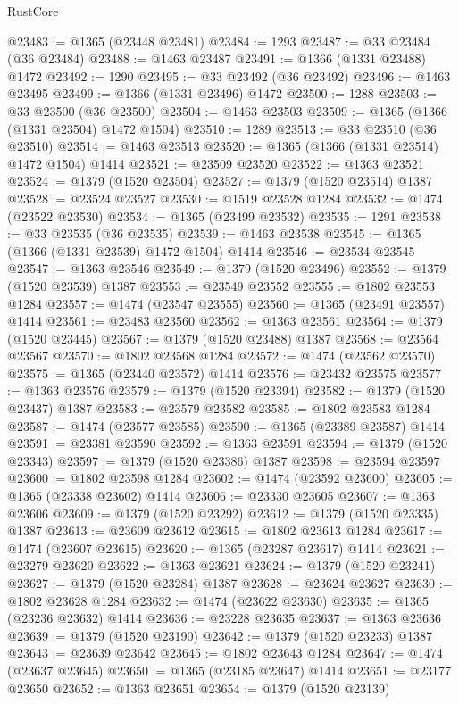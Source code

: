 \begin{lexlean}{RustCore}
\begin{coremodule}
@23483 := @1365 (@23448 @23481)
@23484 := 1293
@23487 := @33 @23484 (@36 @23484)
@23488 := @1463 @23487
@23491 := @1366 (@1331 @23488) @1472
@23492 := 1290
@23495 := @33 @23492 (@36 @23492)
@23496 := @1463 @23495
@23499 := @1366 (@1331 @23496) @1472
@23500 := 1288
@23503 := @33 @23500 (@36 @23500)
@23504 := @1463 @23503
@23509 := @1365 (@1366 (@1331 @23504) @1472 @1504)
@23510 := 1289
@23513 := @33 @23510 (@36 @23510)
@23514 := @1463 @23513
@23520 := @1365 (@1366 (@1331 @23514) @1472 @1504) @1414
@23521 := @23509 @23520
@23522 := @1363 @23521
@23524 := @1379 (@1520 @23504)
@23527 := @1379 (@1520 @23514) @1387
@23528 := @23524 @23527
@23530 := @1519 @23528 @1284
@23532 := @1474 (@23522 @23530)
@23534 := @1365 (@23499 @23532)
@23535 := 1291
@23538 := @33 @23535 (@36 @23535)
@23539 := @1463 @23538
@23545 := @1365 (@1366 (@1331 @23539) @1472 @1504) @1414
@23546 := @23534 @23545
@23547 := @1363 @23546
@23549 := @1379 (@1520 @23496)
@23552 := @1379 (@1520 @23539) @1387
@23553 := @23549 @23552
@23555 := @1802 @23553 @1284
@23557 := @1474 (@23547 @23555)
@23560 := @1365 (@23491 @23557) @1414
@23561 := @23483 @23560
@23562 := @1363 @23561
@23564 := @1379 (@1520 @23445)
@23567 := @1379 (@1520 @23488) @1387
@23568 := @23564 @23567
@23570 := @1802 @23568 @1284
@23572 := @1474 (@23562 @23570)
@23575 := @1365 (@23440 @23572) @1414
@23576 := @23432 @23575
@23577 := @1363 @23576
@23579 := @1379 (@1520 @23394)
@23582 := @1379 (@1520 @23437) @1387
@23583 := @23579 @23582
@23585 := @1802 @23583 @1284
@23587 := @1474 (@23577 @23585)
@23590 := @1365 (@23389 @23587) @1414
@23591 := @23381 @23590
@23592 := @1363 @23591
@23594 := @1379 (@1520 @23343)
@23597 := @1379 (@1520 @23386) @1387
@23598 := @23594 @23597
@23600 := @1802 @23598 @1284
@23602 := @1474 (@23592 @23600)
@23605 := @1365 (@23338 @23602) @1414
@23606 := @23330 @23605
@23607 := @1363 @23606
@23609 := @1379 (@1520 @23292)
@23612 := @1379 (@1520 @23335) @1387
@23613 := @23609 @23612
@23615 := @1802 @23613 @1284
@23617 := @1474 (@23607 @23615)
@23620 := @1365 (@23287 @23617) @1414
@23621 := @23279 @23620
@23622 := @1363 @23621
@23624 := @1379 (@1520 @23241)
@23627 := @1379 (@1520 @23284) @1387
@23628 := @23624 @23627
@23630 := @1802 @23628 @1284
@23632 := @1474 (@23622 @23630)
@23635 := @1365 (@23236 @23632) @1414
@23636 := @23228 @23635
@23637 := @1363 @23636
@23639 := @1379 (@1520 @23190)
@23642 := @1379 (@1520 @23233) @1387
@23643 := @23639 @23642
@23645 := @1802 @23643 @1284
@23647 := @1474 (@23637 @23645)
@23650 := @1365 (@23185 @23647) @1414
@23651 := @23177 @23650
@23652 := @1363 @23651
@23654 := @1379 (@1520 @23139)

\end{coremodule}
\end{lexlean}
